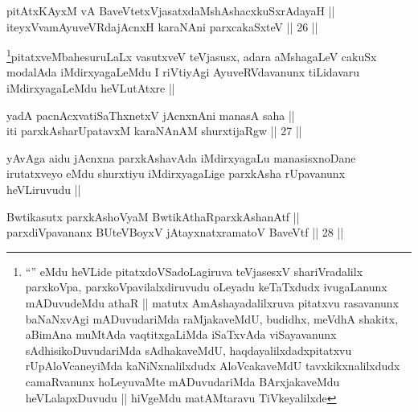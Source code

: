 \begin{shl}
pitAtxKAyxM vA BaveVtetxVjasatxdaMshAshacxkuSxrAdayaH ||  \\
iteyxVvamAyuveVRdajAcnxH karaNAni parxcakaSxteV ||  26 ||  
\end{shl}

\begin{artha}
\footnote[1]{``\stext'' eMdu heVLide pitatxdoVSadoLagiruva teVjasesxV
  shariVradalilx parxkoVpa, parxkoVpavilalxdiruvudu oLeyadu keTaTxdudx
  ivugaLanunx mADuvudeMdu athaR || matutx AmAshayadalilxruva pitatxvu rasavanunx baNaNxvAgi
  mADuvudariMda raMjakaveMdU, budidhx, meVdhA shakitx, aBimAna muMtAda
  vaqtitxgaLiMda iSaTxvAda viSayavanunx sAdhisikoDuvudariMda
  sAdhakaveMdU, haqdayalilxdadxpitatxvu rUpAloVcaneyiMda
  kaNiNxnalilxdudx AloVcakaveMdU tavxkikxnalilxdudx camaRvanunx
  hoLeyuvaMte mADuvudariMda BArxjakaveMdu heVLalapxDuvudu || hiVgeMdu
  matAMtaravu TiVkeyalilxde}pitatxveMbahesuruLaLx vasutxveV teVjasusx, adara aMshagaLeV cakuSx
modalAda iMdirxyagaLeMdu I riVtiyAgi AyuveRVdavanunx tiLidavaru
iMdirxyagaLeMdu heVLutAtxre ||
\end{artha}


\begin{shl}
yadA pacnAcxvatiSaThxnetxV jAcnxnAni manasA saha || \\
iti parxkAsharUpatavxM karaNAnAM shurxtijaRgw ||  27 ||  
\end{shl}

\begin{artha}
yAvAga aidu jAcnxna parxkAshavAda iMdirxyagaLu manasisxnoDane
irutatxveyo eMdu shurxtiyu iMdirxyagaLige parxkAsha rUpavanunx
heVLiruvudu ||
\end{artha}

\begin{shl}
Bwtikasutx parxkAshoV\s yaM BwtikAthaRparxkAshanAtf || \\
parxdiVpavananx BUteVBoyxV jAtayxnatxramatoV BaveVtf ||  28 ||  
\end{shl}

